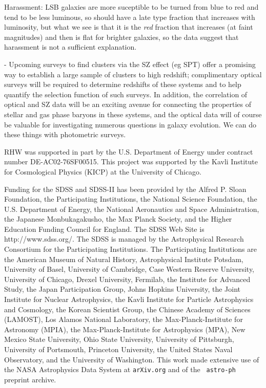 \documentclass{emulateapj}
\begin{document}
Harassment: LSB galaxies are more suceptible to be turned from blue to red \citep{Moore99} and tend to be less luminous, so should have a late type fraction that increases with luminosity, \citep{Weinmann06a} but what we see is that it is the {\it red} fraction that increases (at faint magnitudes) and then is flat for brighter galaxies, so the data suggest that harassment is not a sufficient explanation.


- Upcoming surveys to find clusters via the SZ effect (eg SPT) offer a
promising way to establish a large sample of clusters to high
redshift; complimentary optical surveys will be required to determine
redshifts of these systems and to help quantify the selection function
of such surveys. In addition, the correlation of optical and SZ data
will be an exciting avenue for connecting the properties of stellar
and gas phase baryons in these systems, and the optical data will of
course be valuable for investigating numerous questions in galaxy
evolution. We can do these things with photometric surveys.


\acknowledgments
RHW was supported in part by the U.S. Department
of Energy under contract number DE-AC02-76SF00515. This project was supported by the Kavli Institute for Cosmological Physics (KICP) at the University of Chicago.

Funding for the SDSS and SDSS-II has been provided by the Alfred
P. Sloan Foundation, the Participating Institutions, the National
Science Foundation, the U.S. Department of Energy, the National
Aeronautics and Space Administration, the Japanese Monbukagakusho, the
Max Planck Society, and the Higher Education Funding Council for
England. The SDSS Web Site is http://www.sdss.org/.  The SDSS is
managed by the Astrophysical Research Consortium for the Participating
Institutions. The Participating Institutions are the American Museum
of Natural History, Astrophysical Institute Potsdam, University of
Basel, University of Cambridge, Case Western Reserve University,
University of Chicago, Drexel University, Fermilab, the Institute for
Advanced Study, the Japan Participation Group, Johns Hopkins
University, the Joint Institute for Nuclear Astrophysics, the Kavli
Institute for Particle Astrophysics and Cosmology, the Korean
Scientist Group, the Chinese Academy of Sciences (LAMOST), Los Alamos
National Laboratory, the Max-Planck-Institute for Astronomy (MPIA),
the Max-Planck-Institute for Astrophysics (MPA), New Mexico State
University, Ohio State University, University of Pittsburgh,
University of Portsmouth, Princeton University, the United States
Naval Observatory, and the University of Washington.  This work made
extensive use of the NASA Astrophysics Data System at {\tt arXiv.org} and of the {\tt
  astro-ph} preprint archive.
\end{document}

